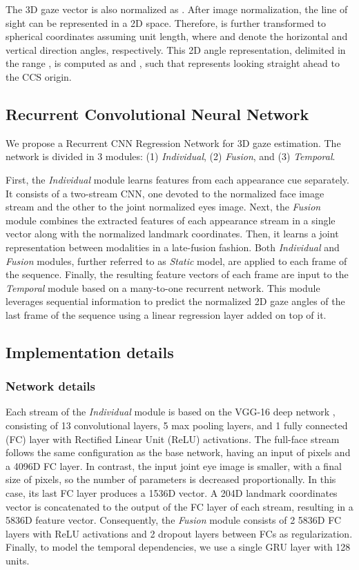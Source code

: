 \documentclass{bmvc2k}
\begin{document}
The 3D gaze vector is also normalized as . After image normalization, the line of sight can be represented in a 2D space. Therefore,  is further transformed to spherical coordinates  assuming unit length, where  and  denote the horizontal and vertical direction angles, respectively. This 2D angle representation, delimited in the range , is computed as  and , such that  represents looking straight ahead to the CCS origin.

\subsection{Recurrent Convolutional Neural Network}
\label{sec:arch}

We propose a Recurrent CNN Regression Network for 3D gaze estimation. The network is divided in 3 modules: (1) \textit{Individual}, (2) \textit{Fusion}, and (3) \textit{Temporal}. 

First, the \textit{Individual} module learns features from each appearance cue separately. It consists of a two-stream CNN, one devoted to the normalized face image stream and the other to the joint normalized eyes image. Next, the \textit{Fusion} module combines the extracted features of each appearance stream in a single vector along with the normalized landmark coordinates. Then, it learns a joint representation between modalities in a late-fusion fashion. Both \textit{Individual} and \textit{Fusion} modules, further referred to as \textit{Static} model, are applied to each frame of the sequence. Finally, the resulting feature vectors of each frame are input to the \textit{Temporal} module based on a many-to-one recurrent network. This module leverages sequential information to predict the normalized 2D gaze angles of the last frame of the sequence using a linear regression layer added on top of it. 

\subsection{Implementation details}
\label{sec:implementation}

\subsubsection{Network details}
\label{sec:netdetails}

Each stream of the \textit{Individual} module is based on the VGG-16 deep network \cite{Parkhi15}, consisting of 13 convolutional layers, 5 max pooling layers, and 1 fully connected (FC) layer with Rectified Linear Unit (ReLU) activations. The full-face stream follows the same configuration as the base network, having an input of  pixels and a 4096D FC layer. In contrast, the input joint eye image is smaller, with a final size of  pixels, so the number of parameters is decreased proportionally. In this case, its last FC layer produces a 1536D vector. A 204D landmark coordinates vector is concatenated to the output of the FC layer of each stream, resulting in a 5836D feature vector. Consequently, the \textit{Fusion} module consists of 2 5836D FC layers with ReLU activations and 2 dropout layers between FCs as regularization. Finally, to model the temporal dependencies, we use a single GRU layer with 128 units.
\end{document}
